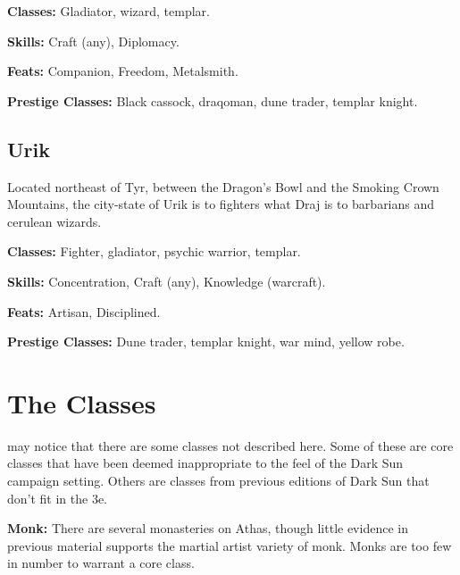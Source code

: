 \documentclass[10pt,a4paper,twocolumn]{d20}
\begin{document}
{\textbf{Classes:} Gladiator, wizard, templar.

\textbf{Skills:} Craft (any), Diplomacy.

\textbf{Feats:} Companion, Freedom, Metalsmith.

\textbf{Prestige Classes:} Black cassock, draqoman, dune trader, templar knight.

\subsection{Urik}
Located northeast of Tyr, between the Dragon’s Bowl and the Smoking Crown Mountains, the city‐state of Urik is to fighters what Draj is to barbarians and cerulean wizards.

\textbf{Classes:} Fighter, gladiator, psychic warrior, templar.

\textbf{Skills:} Concentration, Craft (any), Knowledge (warcraft).

\textbf{Feats:} Artisan, Disciplined.

\textbf{Prestige Classes:} Dune trader, templar knight, war mind, yellow robe.


\section{The Classes}

 may notice that there are some classes not described here. Some of these are core classes that have been deemed inappropriate to the feel of the Dark Sun campaign setting. Others are classes from previous editions of Dark Sun that don’t fit in the 3e.

\textbf{Monk:} There are several monasteries on Athas, though little evidence in previous material supports the martial artist variety of monk. Monks are too few in number to warrant a core class.

}
\end{document}
